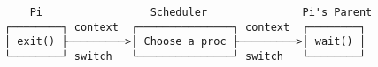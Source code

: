 \documentclass[varwidth=50em,crop]{standalone}
\begin{document}
\begin{verbatim}
    Pi                 Scheduler               Pi's Parent
┌────────┐ context  ┌───────────────┐ context  ┌────────┐
│ exit() ├─────────>│ Choose a proc ├─────────>│ wait() │
└────────┘ switch   └───────────────┘ switch   └────────┘
\end{verbatim}
\end{document}
